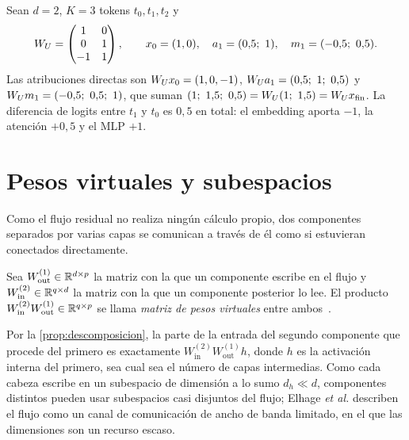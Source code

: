 \begin{ejemplo}\label{ej:atribucion}
Sean $d=2$, $K=3$ tokens $t_0,t_1,t_2$ y
\[
W_{U}=\begin{pmatrix}1&0\\0&1\\-1&1\end{pmatrix},\qquad x_0=(1,0),\quad a_1=(0{,}5;\allowbreak\ 1),\quad m_1=(-0{,}5;\allowbreak\ 0{,}5).
\]
Las atribuciones directas son $W_{U} x_0=(1,0,-1)$, $\WU a_1=(0{,}5;\allowbreak\ 1;\allowbreak\ 0{,}5)$ y $\WU m_1=(-0{,}5;\allowbreak\ 0{,}5;\allowbreak\ 1)$, que suman $(1;\allowbreak\ 1{,}5;\allowbreak\ 0{,}5)=\WU(1;\allowbreak\ 1{,}5)=\WU x_{\mathrm{fin}}$. La diferencia de logits entre $t_1$ y $t_0$ es $0{,}5$ en total: el embedding aporta $-1$, la atención $+0{,}5$ y el MLP $+1$.
\end{ejemplo}

\section{Pesos virtuales y subespacios}

Como el flujo residual no realiza ningún cálculo propio, dos componentes separados por varias capas se comunican a través de él como si estuvieran conectados directamente.

\begin{definicion}\label{def:virtuales}
Sea $W_{\mathrm{out}}^{(1)}\in\mathbb{R}^{d\times p}$ la matriz con la que un componente escribe en el flujo y $W_{\mathrm{in}}^{(2)}\in\mathbb{R}^{q\times d}$ la matriz con la que un componente posterior lo lee. El producto $W_{\mathrm{in}}^{(2)}W_{\mathrm{out}}^{(1)}\in\mathbb{R}^{q\times p}$ se llama \emph{matriz de pesos virtuales} entre ambos~\cite[«Virtual Weights and the Residual Stream as a Communication Channel»]{elhage21}.
\end{definicion}

Por la \cref{prop:descomposicion}, la parte de la entrada del segundo componente que procede del primero es exactamente $W_{\mathrm{in}}^{(2)}W_{\mathrm{out}}^{(1)}h$, donde $h$ es la activación interna del primero, sea cual sea el número de capas intermedias. Como cada cabeza escribe en un subespacio de dimensión a lo sumo $d_h\ll d$, componentes distintos pueden usar subespacios casi disjuntos del flujo; Elhage \emph{et al.} describen el flujo como un canal de comunicación de ancho de banda limitado, en el que las dimensiones son un recurso escaso.

